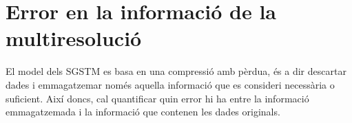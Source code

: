 








\section{Error en la informació de la multiresolució}

El model dels \gls{SGSTM} es basa en una compressió amb pèrdua, és a
dir descartar dades i emmagatzemar només aquella informació que es
consideri necessària o suficient. Així doncs, cal quantificar quin
error hi ha entre la informació emmagatzemada i la informació que
contenen les dades originals.


